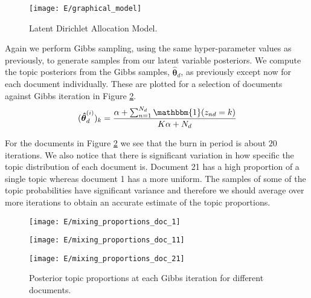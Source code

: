 \documentclass[11pt]{article}
\begin{document}
\begin{figure}
    \centering
    \texttt{[image: E/graphical\_model]}
    \caption{Latent Dirichlet Allocation Model.}
    \label{fig:E_graphical_model}
\end{figure}

Again we perform Gibbs sampling, using the same hyper-parameter values as previously, to generate samples from our latent variable posteriors. We compute the topic posteriors from the Gibbs samples, $\boldsymbol{\hat \theta}_d$, as previously except now for each document individually. These are plotted for a selection of documents against Gibbs iteration in Figure \ref{fig:E_topic_proportions}.
\begin{equation}
    \begin{aligned}
        (\boldsymbol{\hat \theta}_d^{(i)})_k = \frac{\alpha + \sum_{n=1}^{N_d} \mathbbm{1}(z_{nd} = k)}{K \alpha + N_d}
    \end{aligned}
\end{equation}

For the documents in Figure \ref{fig:E_topic_proportions} we see that the burn in period is about $20$ iterations. We also notice that there is significant variation in how specific the topic distribution of each document is. Document 21 has a high proportion of a single topic whereas document 1 has a more uniform. The samples of some of the topic probabilities have significant variance and therefore we should average over more iterations to obtain an accurate estimate of the topic proportions.

\begin{figure}
    \centering
    \begin{minipage}{0.32\textwidth}
        \centering
        \texttt{[image: E/mixing\_proportions\_doc\_1]}
        \label{fig:E_topics_0}
    \end{minipage}
    \begin{minipage}{0.32\textwidth}
        \centering
        \texttt{[image: E/mixing\_proportions\_doc\_11]}
        \label{fig:E_topics_1}
    \end{minipage}
    \begin{minipage}{0.32\textwidth}
        \centering
        \texttt{[image: E/mixing\_proportions\_doc\_21]}
        \label{fig:E_topics_2}
    \end{minipage}
    \caption{Posterior topic proportions at each Gibbs iteration for different documents.}
    \label{fig:E_topic_proportions}
\end{figure}
\end{document}
